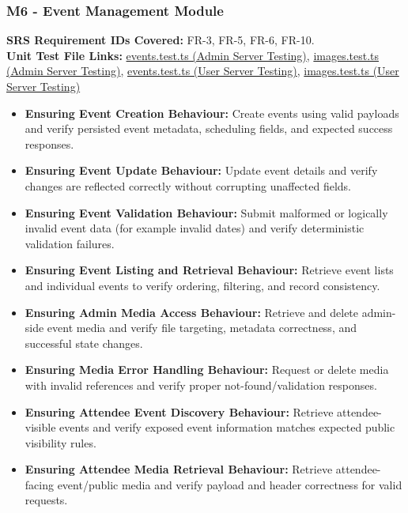 \documentclass[12pt, titlepage]{article}
\begin{document}
\subsubsection{M6 - Event Management Module}
\textbf{SRS Requirement IDs Covered:} FR-3, FR-5, FR-6, FR-10.
\\
\textbf{Unit Test File Links:} \href{https://github.com/VirochaanRG/MES-Event-Management-System/blob/main/test/Server%20API%20Testing/Admin%20Server%20Testing/events.test.ts}{events.test.ts (Admin Server Testing)}, \href{https://github.com/VirochaanRG/MES-Event-Management-System/blob/main/test/Server%20API%20Testing/Admin%20Server%20Testing/images.test.ts}{images.test.ts (Admin Server Testing)}, \href{https://github.com/VirochaanRG/MES-Event-Management-System/blob/main/test/Server%20API%20Testing/User%20Server%20Testing/events.test.ts}{events.test.ts (User Server Testing)}, \href{https://github.com/VirochaanRG/MES-Event-Management-System/blob/main/test/Server%20API%20Testing/User%20Server%20Testing/images.test.ts}{images.test.ts (User Server Testing)}
\begin{itemize}
  \item \textbf{Ensuring Event Creation Behaviour:} Create events using valid payloads and verify persisted event metadata, scheduling fields, and expected success responses.
  \item \textbf{Ensuring Event Update Behaviour:} Update event details and verify changes are reflected correctly without corrupting unaffected fields.
  \item \textbf{Ensuring Event Validation Behaviour:} Submit malformed or logically invalid event data (for example invalid dates) and verify deterministic validation failures.
  \item \textbf{Ensuring Event Listing and Retrieval Behaviour:} Retrieve event lists and individual events to verify ordering, filtering, and record consistency.
  \item \textbf{Ensuring Admin Media Access Behaviour:} Retrieve and delete admin-side event media and verify file targeting, metadata correctness, and successful state changes.
  \item \textbf{Ensuring Media Error Handling Behaviour:} Request or delete media with invalid references and verify proper not-found/validation responses.
  \item \textbf{Ensuring Attendee Event Discovery Behaviour:} Retrieve attendee-visible events and verify exposed event information matches expected public visibility rules.
  \item \textbf{Ensuring Attendee Media Retrieval Behaviour:} Retrieve attendee-facing event/public media and verify payload and header correctness for valid requests.
\end{itemize}
\end{document}
